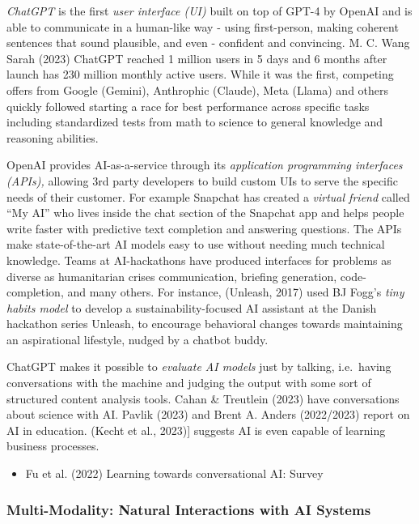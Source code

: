 \documentclass[
  letterpaper,
  DIV=11,
  numbers=noendperiod]{scrartcl}
\providecommand{\tightlist}{%
  \setlength{\itemsep}{0pt}\setlength{\parskip}{0pt}}\usepackage{longtable,booktabs,array}
\begin{document}
\emph{ChatGPT} is the first \emph{user interface (UI)} built on top of
GPT-4 by OpenAI and is able to communicate in a human-like way - using
first-person, making coherent sentences that sound plausible, and even -
confident and convincing. M. C. Wang Sarah (2023) ChatGPT reached 1
million users in 5 days and 6 months after launch has 230 million
monthly active users. While it was the first, competing offers from
Google (Gemini), Anthrophic (Claude), Meta (Llama) and others quickly
followed starting a race for best performance across specific tasks
including standardized tests from math to science to general knowledge
and reasoning abilities.

OpenAI provides AI-as-a-service through its \emph{application
programming interfaces (APIs),} allowing 3rd party developers to build
custom UIs to serve the specific needs of their customer. For example
Snapchat has created a \emph{virtual friend} called ``My AI'' who lives
inside the chat section of the Snapchat app and helps people write
faster with predictive text completion and answering questions. The APIs
make state-of-the-art AI models easy to use without needing much
technical knowledge. Teams at AI-hackathons have produced interfaces for
problems as diverse as humanitarian crises communication, briefing
generation, code-completion, and many others. For instance, (Unleash,
2017) used BJ Fogg's \emph{tiny habits model} to develop a
sustainability-focused AI assistant at the Danish hackathon series
Unleash, to encourage behavioral changes towards maintaining an
aspirational lifestyle, nudged by a chatbot buddy.

ChatGPT makes it possible to \emph{evaluate AI models} just by talking,
i.e.~having conversations with the machine and judging the output with
some sort of structured content analysis tools. Cahan \& Treutlein
(2023) have conversations about science with AI. Pavlik (2023) and Brent
A. Anders (2022/2023) report on AI in education. (Kecht et al., 2023){]}
suggests AI is even capable of learning business processes.

\begin{itemize}
\tightlist
\item
  Fu et al. (2022) Learning towards conversational AI: Survey
\end{itemize}

\subsubsection{\texorpdfstring{Multi-Modality: \textbf{Natural}
\textbf{Interactions with} AI
Systems}{Multi-Modality: Natural Interactions with AI Systems}}\label{multi-modality-natural-interactions-with-ai-systems}
\end{document}
